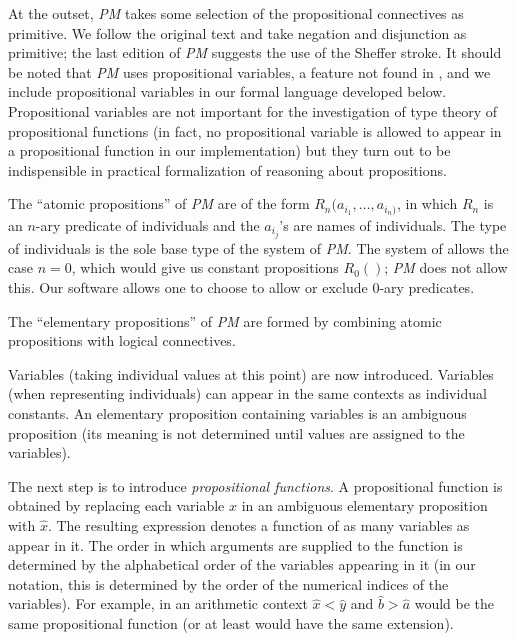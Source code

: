 \documentclass{article}
\begin{document}
At the outset, {\em PM\/} takes some selection of the propositional
connectives as primitive.  We follow the original text and take
negation and disjunction as primitive; the last edition of {\em PM\/}
suggests the use of the Sheffer stroke.  It should be noted that {\em
PM\/} uses propositional variables, a feature not found in
\cite{types40}, and we include propositional variables in our formal
language developed below.  Propositional variables are not important
for the investigation of type theory of propositional functions (in
fact, no propositional variable is allowed to appear in a
propositional function in our implementation) but they turn out to be
indispensible in practical formalization of reasoning about
propositions.

The ``atomic propositions'' of {\em PM\/} are of the form
$R_n(a_{i_1},\ldots,a_{i_n)}$, in which $R_n$ is an $n$-ary predicate
of individuals and the $a_{i_j}$'s are names of individuals.  The type of
individuals is the sole base type of the system of {\em PM\/}.  The
system of \cite{types40} allows the case $n=0$, which would give us
constant propositions $R_0()$; {\em PM\/} does not allow this.  Our
software allows one to choose to allow or exclude 0-ary predicates.

The ``elementary propositions'' of {\em PM\/} are formed by combining
atomic propositions with logical connectives.

Variables (taking individual values at this point) are now introduced.
Variables (when representing individuals) can appear in the same
contexts as individual constants.  An elementary proposition
containing variables is an ambiguous proposition (its meaning is not
determined until values are assigned to the variables).

The next step is to introduce {\em propositional functions\/}.  A
propositional function is obtained by replacing each variable $x$ in
an ambiguous elementary proposition with $\hat{x}$.  The resulting
expression denotes a function of as many variables as appear in it.
The order in which arguments are supplied to the function is
determined by the alphabetical order of the variables appearing in it
(in our notation, this is determined by the order of the numerical
indices of the variables).  For example, in an arithmetic context
$\hat{x}<\hat{y}$ and $\hat{b}>\hat{a}$ would be the same
propositional function (or at least would have the same extension).
\end{document}
